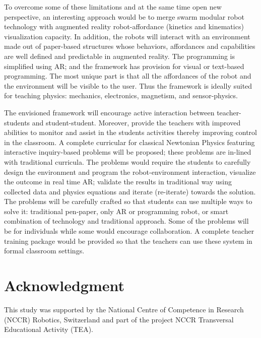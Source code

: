 \documentclass[conference]{IEEEtran}
\begin{document}
To overcome some of these limitations and at the same time open new perspective, an interesting approach would be to 
merge swarm modular robot technology with augmented reality robot-affordance (kinetics and kinematics) visualization 
capacity. In addition, the robots will interact with an environment made out of paper-based structures whose behaviors, 
affordances and capabilities are well defined and predictable in augmented reality. The programming is simplified using 
AR; and the framework has provision for visual or text-based programming. The most unique part is that all the 
affordances of the robot and the environment will be visible to the user. Thus the framework is ideally suited for 
teaching physics: mechanics, electronics, magnetism, and sensor-physics. 

The envisioned framework will encourage active interaction between teacher-students and student-student. Moreover, 
provide the teachers with improved abilities to monitor and assist in the students activities thereby improving control 
in the classroom. A complete curricular for classical Newtonian Physics featuring interactive inquiry-based problems 
will be proposed; these problems are in-lined with traditional curricula. The problems would require the students to 
carefully design the environment and program the robot-environment interaction, visualize the outcome in real time 
AR; validate the results in traditional way using collected data and physics equations and iterate 
(re-iterate) towards the solution. The problems will be carefully crafted so that students can use multiple ways to 
solve it: traditional pen-paper, only AR or programming robot, or smart combination of technology and traditional 
approach. Some of the problems will be for individuals while some would encourage collaboration. A complete 
teacher training package would be provided so that the teachers can use these system in formal classroom settings.


\section*{Acknowledgment}

This study was supported by the National Centre of Competence in Research (NCCR) Robotics, Switzerland and part of the 
project NCCR Transversal Educational Activity (TEA).


\end{document}
